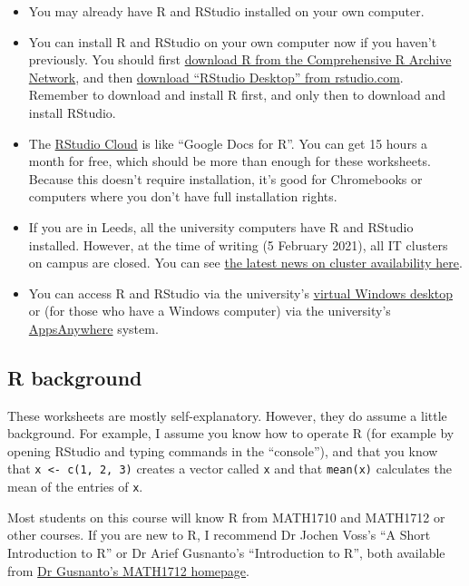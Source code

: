 \documentclass[
  a4paper,
]{article}
\providecommand{\tightlist}{%
  \setlength{\itemsep}{0pt}\setlength{\parskip}{0pt}}
\theoremstyle{definition}
\theoremstyle{definition}
\theoremstyle{definition}
\theoremstyle{remark}
\begin{document}
\begin{itemize}
\tightlist
\item
  You may already have R and RStudio installed on your own computer.
\item
  You can install R and RStudio on your own computer now if you haven't previously. You should first \href{https://cran.rstudio.com/}{download R from the Comprehensive R Archive Network}, and then \href{https://rstudio.com/products/rstudio/download/\#download}{download ``RStudio Desktop'' from rstudio.com}. Remember to download and install R first, and only then to download and install RStudio.
\item
  The \href{https://rstudio.cloud/}{RStudio Cloud} is like ``Google Docs for R''. You can get 15 hours a month for free, which should be more than enough for these worksheets. Because this doesn't require installation, it's good for Chromebooks or computers where you don't have full installation rights.
\item
  If you are in Leeds, all the university computers have R and RStudio installed. However, at the time of writing (5 February 2021), all IT clusters on campus are closed. You can see \href{https://leeds.service-now.com/it?id=clusters}{the latest news on cluster availability here}.
\item
  You can access R and RStudio via the university's \href{https://it.leeds.ac.uk/it?id=kb_article\&sysparm_article=KB0014548}{virtual Windows desktop} or (for those who have a Windows computer) via the university's \href{https://it.leeds.ac.uk/it?id=kb_article\&sysparm_article=KB0014827}{AppsAnywhere} system.
\end{itemize}

\hypertarget{R-background}{%
\subsection*{R background}\label{R-background}}

These worksheets are mostly self-explanatory. However, they do assume a little background. For example, I assume you know how to operate R (for example by opening RStudio and typing commands in the ``console''), and that you know that \texttt{x\ \textless{}-\ c(1,\ 2,\ 3)} creates a vector called \texttt{x} and that \texttt{mean(x)} calculates the mean of the entries of \texttt{x}.

Most students on this course will know R from MATH1710 and MATH1712 or other courses. If you are new to R, I recommend Dr Jochen Voss's ``A Short Introduction to R'' or Dr Arief Gusnanto's ``Introduction to R'', both available from \href{http://www1.maths.leeds.ac.uk/~arief/MATH1712/index.html}{Dr Gusnanto's MATH1712 homepage}.
\end{document}
